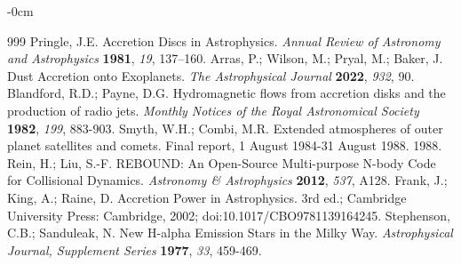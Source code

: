 \documentclass[journal,article,submit,pdftex,moreauthors]{Definitions/mdpi}
\begin{document}
\begin{adjustwidth}{-\extralength}{0cm}
\begin{thebibliography}{999}
Pringle, J.E. Accretion Discs in Astrophysics. {\em Annual Review of Astronomy and Astrophysics} {\bf 1981}, {\em 19}, 137--160.
Arras, P.; Wilson, M.; Pryal, M.; Baker, J. Dust Accretion onto Exoplanets. {\em The Astrophysical Journal} {\bf 2022}, {\em 932}, 90.
Blandford, R.D.; Payne, D.G. Hydromagnetic flows from accretion disks and the production of radio jets. {\em Monthly Notices of the Royal Astronomical Society} {\bf 1982}, {\em 199}, 883-903.
Smyth, W.H.; Combi, M.R. Extended atmospheres of outer planet satellites and comets. Final report, 1 August 1984-31 August 1988. 1988.
Rein, H.; Liu, S.-F. REBOUND: An Open-Source Multi-purpose N-body Code for Collisional Dynamics. {\em Astronomy & Astrophysics} {\bf 2012}, {\em 537}, A128.
Frank, J.; King, A.; Raine, D. Accretion Power in Astrophysics. 3rd ed.; Cambridge University Press: Cambridge, 2002; doi:10.1017/CBO9781139164245.
Stephenson, C.B.; Sanduleak, N. New H-alpha Emission Stars in the Milky Way. {\em Astrophysical Journal, Supplement Series} {\bf 1977}, {\em 33}, 459-469.
\end{thebibliography}

%


\PublishersNote{}
\end{adjustwidth}
\end{document}
